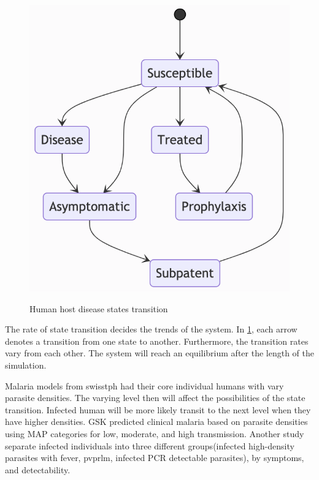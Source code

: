\documentclass[a4paper, 12pt, twoside]{article}
\begin{document}
\begin{figure}[t]
	\centering
	\includegraphics[keepaspectratio=true, scale=0.8]{images/disease-state-transition-diagram.png}
	\label{fig:human_state}
	\caption{Human host disease states transition}
\end{figure}

The rate of state transition decides the trends of the system.
In \ref{fig:human_state}, each arrow denotes a transition from one state to another.
Furthermore, the transition rates vary from each other.
The system will reach an equilibrium after the length of the simulation.

Malaria models from \gls{swisstph} had their core individual humans with vary parasite densities.
The varying level then will affect the possibilities of the state transition.
Infected human will be more likely transit to the next level when they have higher densities.
GSK predicted clinical malaria based on parasite densities using MAP categories for low, moderate, and high transmission.\cite{Hay2004}
Another study separate infected individuals into three different groups(infected high-density parasites with fever, \gls{pvprlm}, infected PCR detectable parasites)\cite{White2018b}, by symptoms, and detectability.
\end{document}
